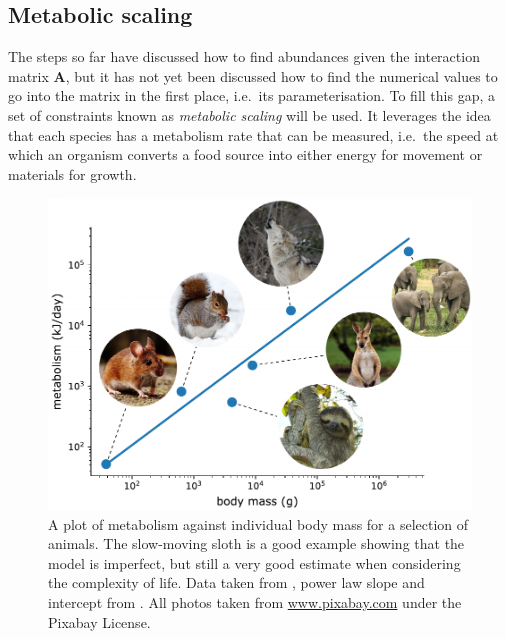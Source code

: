


\subsection{Metabolic scaling}
\label{sec:metabolism}
The steps so far have discussed how to find abundances given the interaction matrix $\mathbf{A}$, but it has not yet been discussed how to find the numerical values to go into the matrix in the first place, i.e.\ its parameterisation.
To fill this gap, a set of constraints known as \emph{metabolic scaling} will be used.
It leverages the idea that each species has a metabolism rate that can be measured, i.e.\ the speed at which an organism converts a food source into either energy for movement or materials for growth.

\begin{figure}
    \centering
    \includegraphics[width=.8\textwidth]{joy/metabolism.pdf}
    \caption[A plot of metabolism against individual body mass]{A plot of metabolism against individual body mass for a selection of animals. The slow-moving sloth is a good example showing that the model is imperfect, but still a very good estimate when considering the complexity of life. Data taken from \citep{Nagy1999}, power law slope and intercept from \citep[Fig.~2]{Brown2004}. All photos taken from \url{www.pixabay.com} under the Pixabay License.}
    \label{fig:metabolism}
\end{figure}

